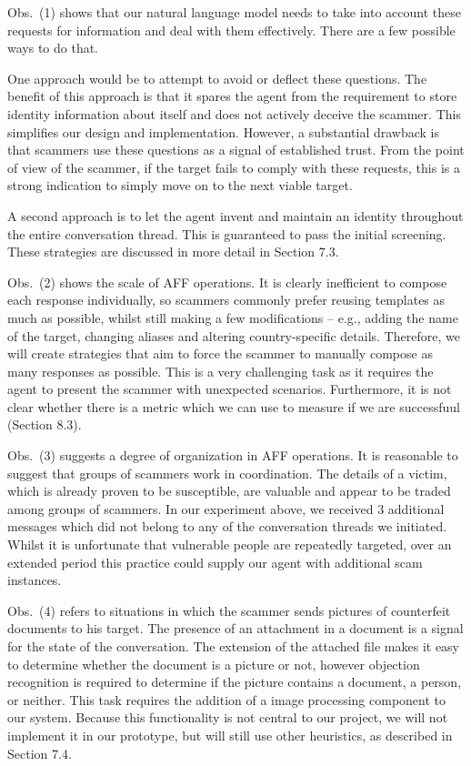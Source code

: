 Obs.~(1) shows that our natural language model needs to take into account these requests for information and deal with them effectively. There are a few possible ways to do that. 

One approach would be to attempt to avoid or deflect these questions. The benefit of this approach is that it spares the agent from the requirement to store identity information about itself and does not actively deceive the scammer. This simplifies our design and implementation. However, a substantial drawback is that scammers use these questions as a signal of established trust. From the point of view of the scammer, if the target fails to comply with these requests, this is a strong indication to simply move on to the next viable target. 

A second approach is to let the agent invent and maintain an identity throughout the entire conversation thread. This is guaranteed to pass the initial screening. These strategies are discussed in more detail in Section 7.3.

Obs.~(2) shows the scale of AFF operations. It is clearly inefficient to compose each response individually, so scammers commonly prefer reusing templates as much as possible, whilst still making a few modifications -- e.g., adding the name of the target, changing aliases and altering country-specific details. Therefore, we will create strategies that aim to force the scammer to manually compose as many responses as possible. This is a very challenging task as it requires the agent to present the scammer with unexpected scenarios. Furthermore, it is not clear whether there is a metric which we can use to measure if we are successfuul (Section 8.3).

Obs.~(3) suggests a degree of organization in AFF operations. It is reasonable to suggest that groups of scammers work in coordination. The details of a victim, which is already proven to be susceptible, are valuable and appear to be traded among groups of scammers. In our experiment above, we received 3 additional messages which did not belong to any of the conversation threads we initiated. Whilst it is unfortunate that vulnerable people are repeatedly targeted, over an extended period this practice could supply our agent with additional scam instances. 

Obs.~(4) refers to situations in which the scammer sends pictures of counterfeit documents to his target. The presence of an attachment in a document is a signal for the state of the conversation. The extension of the attached file makes it easy to determine whether the document is a picture or not, however objection recognition is required to determine if the picture contains a document, a person,  or neither. This task requires the addition of a image processing component to our system. Because this functionality is not central to our project, we will not implement it in our prototype, but will still use other heuristics, as described in Section 7.4.

